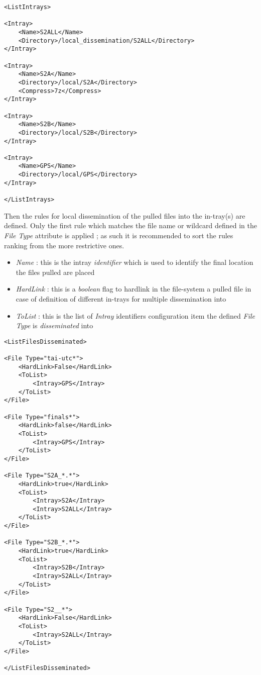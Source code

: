 \documentclass[dec_sum_main.tex]{subfiles}
\begin{document}
\begin{lstlisting}
<ListIntrays>

<Intray>
	<Name>S2ALL</Name>
	<Directory>/local_dissemination/S2ALL</Directory>
</Intray>

<Intray>
	<Name>S2A</Name>
	<Directory>/local/S2A</Directory>
	<Compress>7z</Compress>
</Intray>

<Intray>
	<Name>S2B</Name>
	<Directory>/local/S2B</Directory>
</Intray>

<Intray>
	<Name>GPS</Name>
	<Directory>/local/GPS</Directory>
</Intray>

</ListIntrays>

\end{lstlisting}

\par
\noindent
\label{Intray}
Then the rules for local dissemination of the pulled files into the in-tray(s) are defined. Only the first rule which matches the file name or wildcard defined in the \textit{File Type} attribute is applied ; as such it is recommended to sort the rules ranking from the more restrictive ones.  
\par
\noindent
\begin{itemize}
	\item \textit{Name} : this is the intray \textit{identifier} which is used to identify the final location the files pulled are placed
	\item \textit{HardLink} : this is a \textit{boolean} flag to hardlink in the file-system a pulled file in case of definition of different in-trays for multiple dissemination into
	\item \textit{ToList} : this is the list of \textit{Intray} identifiers configuration item the defined \textit{File Type} is \textit{disseminated} into 
\end{itemize}
\begin{lstlisting}
<ListFilesDisseminated>

<File Type="tai-utc*">
	<HardLink>False</HardLink>
	<ToList>
		<Intray>GPS</Intray>
	</ToList>
</File>

<File Type="finals*">
	<HardLink>false</HardLink>
	<ToList>
		<Intray>GPS</Intray>
	</ToList>
</File>

<File Type="S2A_*.*">
	<HardLink>true</HardLink>
	<ToList>
		<Intray>S2A</Intray>
		<Intray>S2ALL</Intray>
	</ToList>
</File>

<File Type="S2B_*.*">
	<HardLink>true</HardLink>
	<ToList>
		<Intray>S2B</Intray>
		<Intray>S2ALL</Intray>
	</ToList>
</File>

<File Type="S2__*">
	<HardLink>False</HardLink>
	<ToList>
		<Intray>S2ALL</Intray>
	</ToList>
</File>

</ListFilesDisseminated>

\end{lstlisting}
	
\end{document}
